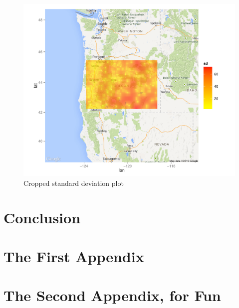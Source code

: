 \documentclass[12pt,twoside]{reedthesis}
\begin{document}
	   
	  
	
	
\begin{figure}[h!]
	   
	       \centering
	  
	    \includegraphics[scale=0.7]{sd_crop}
	
	     \caption{Cropped standard deviation plot}
	 \label{sdcrop}
	\end{figure}
	

\chapter*{Conclusion}
	\setcounter{chapter}{4}
	\setcounter{section}{0}
	



    \appendix
      \chapter{The First Appendix}
      \chapter{The Second Appendix, for Fun}
\end{document}
